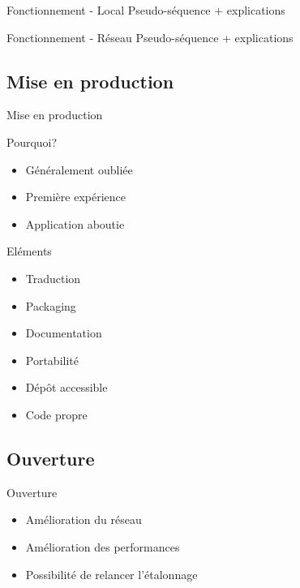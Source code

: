 \documentclass{beamer}
\begin{document}
		\begin{frame}{Fonctionnement - Local}
			Pseudo-séquence + explications
		\end{frame}
		
		\begin{frame}{Fonctionnement - Réseau}
			Pseudo-séquence + explications
		\end{frame}
		
		\subsection{Mise en production}
		\begin{frame}{Mise en production}
			\begin{block}{Pourquoi?}
				\begin{itemize}
					\item Généralement oubliée
					\item Première expérience
					\item Application aboutie
				\end{itemize}
			\end{block}
			\begin{block}{Eléments}
				\begin{itemize}
					\item Traduction
					\item Packaging
					\item Documentation
					\item Portabilité
					\item Dépôt accessible
					\item Code propre
				\end{itemize}
			\end{block}
		\end{frame}
		
		\subsection{Ouverture}
		\begin{frame}{Ouverture}
			\begin{itemize}
				\item Amélioration du réseau
				\item Amélioration des performances
				\item Possibilité de relancer l'étalonnage
			\end{itemize}
		\end{frame}
		
\end{document}
